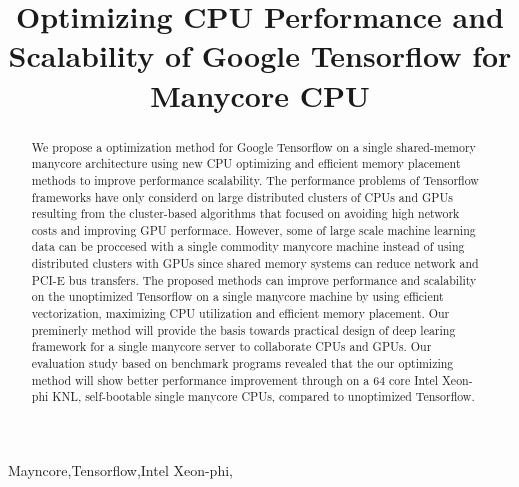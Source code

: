 \documentclass{IOS-Book-Article}
\def\hb{\hbox to 10.7 cm{}}
\begin{document}
\pagestyle{headings}
\def\thepage{}

\begin{frontmatter}              %


\title{Optimizing CPU Performance and Scalability of Google Tensorflow for
Manycore CPU}


\begin{abstract}
We propose a optimization method for Google Tensorflow on a single shared-memory
manycore architecture using new CPU optimizing and efficient memory placement
methods to improve performance scalability.
The performance problems of Tensorflow frameworks have only considerd on large
distributed clusters of CPUs and GPUs resulting from the cluster-based
algorithms that focused on avoiding high network costs and improving GPU
performace.
However, some of large scale machine learning data can be proccesed with a
single commodity manycore machine instead of using distributed clusters
with GPUs since shared memory systems can reduce network and PCI-E bus
transfers.
The proposed methods can improve performance and scalability on the
unoptimized Tensorflow on a single manycore machine by using efficient
vectorization, maximizing CPU utilization and efficient memory placement.
Our preminerly method will provide the basis towards practical
design of deep learing framework for a single manycore server to collaborate
CPUs and GPUs.
Our evaluation study based on benchmark programs revealed that the our
optimizing method will show better performance improvement through on a 64
core Intel Xeon-phi KNL, self-bootable single manycore CPUs, compared to
unoptimized Tensorflow.
\end{abstract}

\begin{keyword}
Mayncore\sep Tensorflow\sep Intel Xeon-phi\sep 
\end{keyword}
\end{frontmatter}
\end{document}
